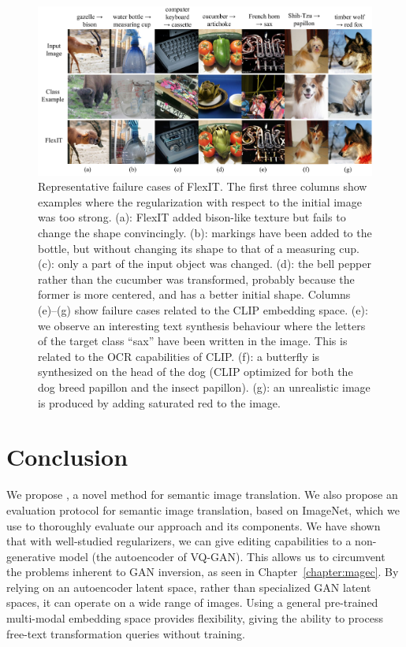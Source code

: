 \begin{figure}[t!]
    \center
    \includegraphics[width=\linewidth]{images/flexit/assets/failures.pdf}
    \caption{
    Representative failure cases of FlexIT. 
    The first three columns show examples where the regularization with respect to the initial image was too strong. (a): FlexIT added bison-like  texture but fails to change  the shape convincingly.
    (b): markings have been added to the  bottle, but without changing its  shape to that  of a measuring cup. 
    (c): only a part of the input object was changed. 
    (d): the bell pepper rather than the cucumber was transformed, probably because the former is more centered, and has a better initial shape. 
    Columns (e)--(g) show failure cases related to the \ac{CLIP} embedding space. 
    (e): we observe an interesting text synthesis behaviour where the letters of the target class ``sax'' have been written in the image. This is related to the OCR capabilities of \ac{CLIP}. 
    (f): a butterfly is synthesized on the head of the dog (\ac{CLIP} optimized for both the dog breed papillon and the insect papillon). 
    (g): an unrealistic image is produced by adding saturated red to the image.
    }
    \label{fig:failures}
\end{figure}

\section{Conclusion}

 We propose \ours, a novel method for semantic image translation.
 We also propose an evaluation protocol for semantic image translation, based on ImageNet,
 which we use to thoroughly evaluate our approach and its components.
 We have shown that with well-studied regularizers, we can give editing capabilities 
 to a non-generative model (the autoencoder of VQ-GAN). This allows us to circumvent the 
 problems inherent to \ac{GAN} inversion, as seen in Chapter~\ref{chapter:magec}.
 By relying on an autoencoder latent space, rather than specialized GAN latent spaces,
 it can operate on a wide range of images. Using a general pre-trained multi-modal 
 embedding space provides  flexibility, giving 
 \ours the ability to process free-text transformation queries without training.


